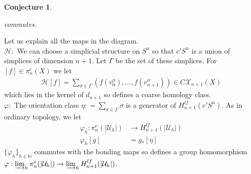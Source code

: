 \documentclass[a4paper,11pt]{article}
\theoremstyle{definition}
\theoremstyle{plain}
\newtheorem{conjecture}[definition]{Conjecture}
\theoremstyle{remark}
\begin{document}
{\begin{conjecture}
\begin{figure}[H]
\centering
{}
\end{figure}
commutes. 
\end{conjecture}

Let us explain all the maps in the diagram.\\

$\mathcal{H}:$ We can choose a simplicial structure on $S^n$ so that $c'S^n$ is a union of simplices of dimension $n+1$. Let $\Gamma$ be the set of these simplices. For $[f]\in \pi^{c}_{n}(X)$ we let 
\begin{align*}
\mathcal{H}[f] = \sum_{\sigma \in \Gamma} (f(v^{\sigma}_0),\dots, f(v^{\sigma}_{n+1})) \in C\mathcal{X}_{n+1}(X)
\end{align*}
which lies in the kernel of $d_{n+1}$ so defines a coarse homology class. \\

$\varphi:$ The orientation class $\eta: = \sum_{\sigma\in \Gamma} \sigma$ is a generator of $H^{lf}_{n+1}(c'S^n)$. As in ordinary topology, we let
\begin{align*}
\varphi_{h}: \pi^e_{n}(|\mathcal{U}_{h}|)&\rightarrow H^{lf}_{n+1}(|\mathcal{U}_{h}|)\\
\varphi_{h} [g] &= g_{*}[\eta]
\end{align*}
$\{\varphi_{h}\}_{h\in \mathbb{N}}$ commutes with the bonding maps so defines a group homomorphism $\varphi:\varinjlim_{h} \pi^{e}_{n}(|\mathcal{U}_{h}|) \rightarrow \varinjlim_{h} H^{lf}_{n+1}(|\mathcal{U}_{h}|)$.\\

}
\end{document}
